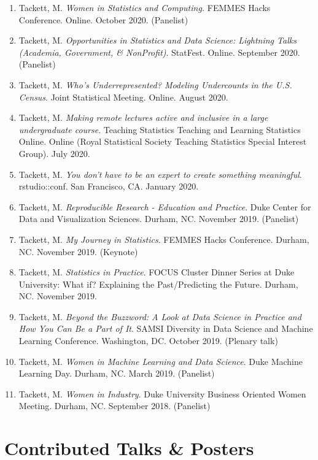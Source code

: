 \documentclass[11pt,dvipsnames]{article}
\begin{document}
\begin{enumerate}
\item
  Tackett, M. \emph{Women in Statistics and Computing.} FEMMES Hacks
  Conference. Online. October 2020. (Panelist)
\item
  Tackett, M. \emph{Opportunities in Statistics and Data Science:
  Lightning Talks (Academia, Government, \& NonProfit)}. StatFest.
  Online. September 2020. (Panelist)
\item
  Tackett, M. \emph{Who's Underrepresented? Modeling Undercounts in the
  U.S. Census}. Joint Statistical Meeting. Online. August 2020.
\item
  Tackett, M. \emph{Making remote lectures active and inclusive in a
  large undergraduate course}. Teaching Statistics Teaching and Learning
  Statistics Online. Online (Royal Statistical Society Teaching
  Statistics Special Interest Group). July 2020.
\item
  Tackett, M. \emph{You don't have to be an expert to create something
  meaningful}. rstudio::conf. San Francisco, CA. January 2020.
\item
  Tackett, M. \emph{Reproducible Research - Education and Practice}.
  Duke Center for Data and Visualization Sciences. Durham, NC. November
  2019. (Panelist)
\item
  Tackett, M. \emph{My Journey in Statistics}. FEMMES Hacks Conference.
  Durham, NC. November 2019. (Keynote)
\item
  Tackett, M. \emph{Statistics in Practice}. FOCUS Cluster Dinner Series
  at Duke University: What if? Explaining the Past/Predicting the
  Future. Durham, NC. November 2019.
\item
  Tackett, M. \emph{Beyond the Buzzword: A Look at Data Science in
  Practice and How You Can Be a Part of It}. SAMSI Diversity in Data
  Science and Machine Learning Conference. Washington, DC. October 2019.
  (Plenary talk)
\item
  Tackett, M. \emph{Women in Machine Learning and Data Science}. Duke
  Machine Learning Day. Durham, NC. March 2019. (Panelist)
\item
  Tackett, M. \emph{Women in Industry}. Duke University Business
  Oriented Women Meeting. Durham, NC. September 2018. (Panelist)
\end{enumerate}

\section{Contributed Talks \& Posters}\label{contributed-talks-posters}
\end{document}
